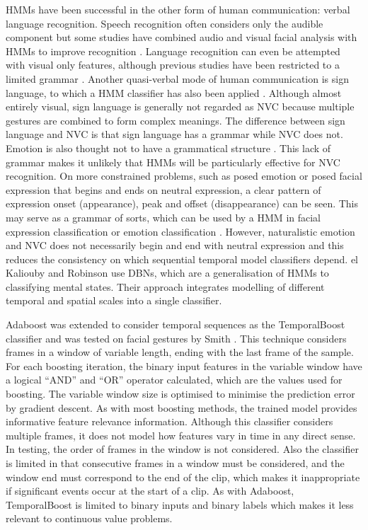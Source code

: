 \ac{HMM}s have been successful in the other form of human communication: verbal language recognition. Speech recognition often considers only the audible component but some studies have combined audio and visual facial analysis with \ac{HMM}s to improve recognition \cite{Potamianos2001, Nefian2002}. Language recognition can even be attempted with visual only features, although previous studies have been restricted to a limited grammar \cite{Luettin1996, Gray1997, Matthews1998, Saitoh2005}. Another quasi-verbal mode of human communication is sign language, to which a \ac{HMM} classifier has also been applied \cite{Starner1995}. Although almost entirely visual, sign language is generally not regarded as \ac{NVC} because multiple gestures are combined to form complex meanings. The difference between sign language and \ac{NVC} is that sign language has a grammar while \ac{NVC} does not. Emotion is also thought not to have a grammatical structure \cite{Cohen2000}. This lack of grammar makes it unlikely that \ac{HMM}s will be particularly effective for \ac{NVC} recognition. On more constrained problems, such as posed emotion or posed facial expression that begins and ends on neutral expression, a clear pattern of expression onset (appearance), peak and offset (disappearance) \cite{Ekman1984} can be seen. This may serve as a grammar of sorts, which can be used by a \ac{HMM} in facial expression classification \cite{Lien1998a} or emotion classification \cite{Cohen2000, Mower2009}. However, naturalistic emotion and \ac{NVC} does not necessarily begin and end with neutral expression and this reduces the consistency on which sequential temporal model classifiers depend. el Kaliouby and Robinson \cite{Kaliouby2005} use \ac{DBN}s, which are a generalisation of \ac{HMM}s to classifying mental states. Their approach integrates modelling of different temporal and spatial scales into a single classifier.


Adaboost was extended to consider temporal sequences as the TemporalBoost classifier and was tested on facial gestures by Smith \etal \cite{Smith2005}. This technique considers frames in a window of variable length, ending with the last frame of the sample. For each boosting iteration, the binary input features in the variable window have a logical ``AND'' and ``OR'' operator calculated, which are the values used for boosting. The variable window size is optimised to minimise the prediction error by gradient descent. As with most boosting methods, the trained model provides informative feature relevance information. Although this classifier considers multiple frames, it does not model how features vary in time in any direct sense. In testing, the order of frames in the window is not considered. Also the classifier is limited in that consecutive frames in a window must be considered, and the window end must correspond to the end of the clip, which makes it inappropriate if significant events occur at the start of a clip. As with Adaboost, TemporalBoost is limited to binary inputs and binary labels which makes it less relevant to continuous value problems.

